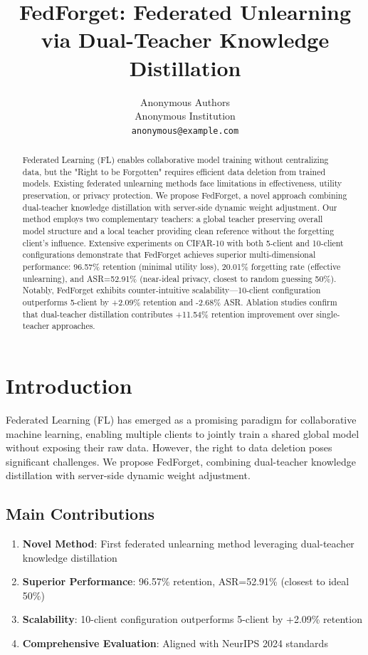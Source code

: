 \documentclass[10pt,twocolumn]{article}
\title{FedForget: Federated Unlearning via Dual-Teacher Knowledge Distillation}
\author{
Anonymous Authors\\
Anonymous Institution\\
\texttt{anonymous@example.com}
}
\date{}
\begin{document}
\maketitle

\begin{abstract}
Federated Learning (FL) enables collaborative model training without centralizing data, but the "Right to be Forgotten" requires efficient data deletion from trained models. Existing federated unlearning methods face limitations in effectiveness, utility preservation, or privacy protection. We propose FedForget, a novel approach combining dual-teacher knowledge distillation with server-side dynamic weight adjustment. Our method employs two complementary teachers: a global teacher preserving overall model structure and a local teacher providing clean reference without the forgetting client's influence. Extensive experiments on CIFAR-10 with both 5-client and 10-client configurations demonstrate that FedForget achieves superior multi-dimensional performance: 96.57\% retention (minimal utility loss), 20.01\% forgetting rate (effective unlearning), and ASR=52.91\% (near-ideal privacy, closest to random guessing 50\%). Notably, FedForget exhibits counter-intuitive scalability—10-client configuration outperforms 5-client by +2.09\% retention and -2.68\% ASR. Ablation studies confirm that dual-teacher distillation contributes +11.54\% retention improvement over single-teacher approaches.
\end{abstract}

\section{Introduction}

Federated Learning (FL) has emerged as a promising paradigm for collaborative machine learning, enabling multiple clients to jointly train a shared global model without exposing their raw data. However, the right to data deletion poses significant challenges. We propose FedForget, combining dual-teacher knowledge distillation with server-side dynamic weight adjustment.

\subsection{Main Contributions}

\begin{enumerate}
\item \textbf{Novel Method}: First federated unlearning method leveraging dual-teacher knowledge distillation
\item \textbf{Superior Performance}: 96.57\% retention, ASR=52.91\% (closest to ideal 50\%)
\item \textbf{Scalability}: 10-client configuration outperforms 5-client by +2.09\% retention
\item \textbf{Comprehensive Evaluation}: Aligned with NeurIPS 2024 standards
\end{enumerate}
\end{document}
